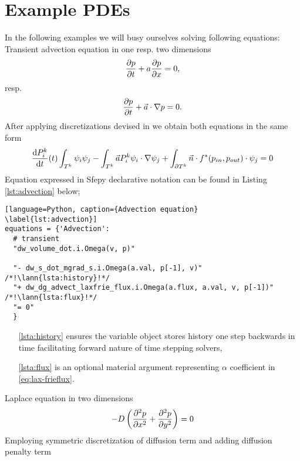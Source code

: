 \section{Example PDEs}
In the following examples we will busy ourselves solving following equations:\\
Transient advection equation in one resp. two dimensions
\begin{equation}
    \label{eq:ex_advection}
    \frac{\partial p}{\partial t} + a\frac{\partial p}{\partial x} = 0,
\end{equation}
resp.
\begin{equation}
    \frac{\partial p}{\partial t} + \vec{a}\cdot\nabla{p} = 0.
\end{equation}
After applying discretizations devised in  we obtain both equations in 
the same form
\begin{equation}
         \frac{\text{d}P^k_i}{\text{d}t}(t)\int_{T^k}\psi_i\psi_j 
         - \int_{T^k} \vec{a}P_i^k\psi_i\cdot\nabla\psi_j 
         + \int_{\partial{T^k}} \vec{n}
        \cdot f^{*} (p_{in}, p_{out})\cdot\psi_j = 0
\end{equation}
Equation expressed in Sfepy declarative notation can be found in Listing 
\ref{lst:advection} below;
\setcounter{lstannotation}{0}
\begin{lstlisting}[language=Python, caption={Advection equation}
\label{lst:advection}]
equations = {'Advection': 
  # transient
  "dw_volume_dot.i.Omega(v, p)"
 
  "- dw_s_dot_mgrad_s.i.Omega(a.val, p[-1], v)" /*!\lann{lsta:history}!*/
  "+ dw_dg_advect_laxfrie_flux.i.Omega(a.flux, a.val, v, p[-1])"  /*!\lann{lsta:flux}!*/
  "= 0"
  }
\end{lstlisting}
\begin{itemize}
    \item[\ref{lsta:history}]  ensures the variable object stores 
    history one step backwards in time facilitating forward nature of time stepping 
    solvers,
    \item[\ref{lsta:flux}]  is an optional material argument 
    representing $\alpha$ coefficient in \eqref{eq:lax-frieflux}.
\end{itemize}
Laplace equation in two dimensions
\begin{equation}
    \label{eq:ex_laplace}
    - D \left(\frac{\partial^2 p}{\partial x^2} + \frac{\partial^2 p}{\partial y^2} \right)= 0
\end{equation}
Employing symmetric discretization of diffusion term and adding diffusion penalty term 
